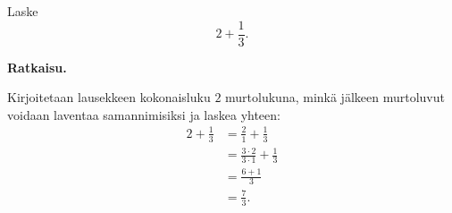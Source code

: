     \begin{esimerkki}
        Laske
        \[
            2 + \frac{1}{3}.
        \]
        
        \textbf{Ratkaisu.}
        
		Kirjoitetaan lausekkeen kokonaisluku $2$ murtolukuna, minkä
		jälkeen murtoluvut voidaan laventaa samannimisiksi
		ja laskea yhteen:
        \begin{align*}
           2 + \frac{1}{3} &= \frac{2}{1} + \frac{1}{3}  \\ 
	       				   &= \frac{3 \cdot 2}{3 \cdot 1} + \frac{1}{3} \\ 
	       				   &= \frac{6+1}{3} \\ 
	       				   &= \frac{7}{3}.
        \end{align*}
    \end{esimerkki}
